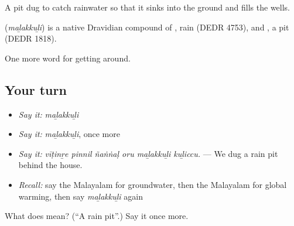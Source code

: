 A pit dug to catch rainwater so that it sinks into the ground and fills the wells.

\begin{cousinweb}
\textbf{} (\emph{maḻakkuḻi}) is a native Dravidian compound of , rain (DEDR 4753), and , a pit (DEDR 1818).
\end{cousinweb}

\begin{grammarlens}[title={What you've built}]
One more word for getting around.
\end{grammarlens}

\subsection*{Your turn}
\begin{itemize}
\raggedright
  \item \emph{Say it:} \emph{maḻakkuḻi}
  \item \emph{Say it:} \emph{maḻakkuḻi}, once more
  \item \emph{Say it:} \emph{vīṭinṟe pinnil ñaṅṅaḷ oru maḻakkuḻi kuḻiccu.} — We dug a rain pit behind the house.
  \item \emph{Recall:} say the Malayalam for groundwater, then the Malayalam for global warming, then say \emph{maḻakkuḻi} again
\end{itemize}

\begin{tcolorbox}[breakable,colback=teal!4,colframe=teal!35!black,title={Before you move on}]
What does  mean? (\textquotedblleft{}A rain pit\textquotedblright{}.) Say it once more.
\end{tcolorbox}
